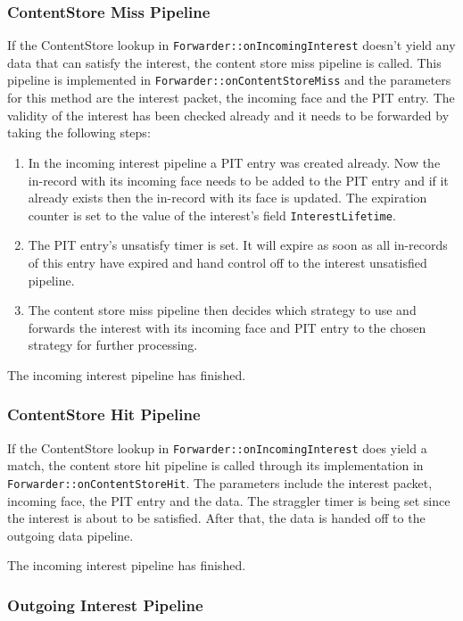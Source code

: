 \subsubsection{ContentStore Miss Pipeline}

If the ContentStore lookup in \texttt{Forwarder::onIncomingInterest} doesn't yield any data that can satisfy the interest, the content store miss pipeline is called. This pipeline is implemented in \texttt{Forwarder::onContentStoreMiss} and the parameters for this method are the interest packet, the incoming face and the PIT entry. The validity of the interest has been checked already and it needs to be forwarded by taking the following steps:

\begin{enumerate}
\item In the incoming interest pipeline a PIT entry was created already. Now the in-record with its incoming face needs to be added to the PIT entry and if it already exists then the in-record with its face is updated. The expiration counter is set to the value of the interest's field \texttt{InterestLifetime}.
\item The PIT entry's unsatisfy timer is set. It will expire as soon as all in-records of this entry have expired and hand control off to the interest unsatisfied pipeline.
\item The content store miss pipeline then decides which strategy to use and forwards the interest with its incoming face and PIT entry to the chosen strategy for further processing.
\end{enumerate}

The incoming interest pipeline has finished.

\subsubsection{ContentStore Hit Pipeline}

If the ContentStore lookup in \texttt{Forwarder::onIncomingInterest} does yield a match, the content store hit pipeline is called through its implementation in \texttt{Forwarder::onContentStoreHit}. The parameters include the interest packet, incoming face, the PIT entry and the data. The straggler timer is being set since the interest is about to be satisfied. After that, the data is handed off to the outgoing data pipeline.

The incoming interest pipeline has finished.

\subsubsection{Outgoing Interest Pipeline}

